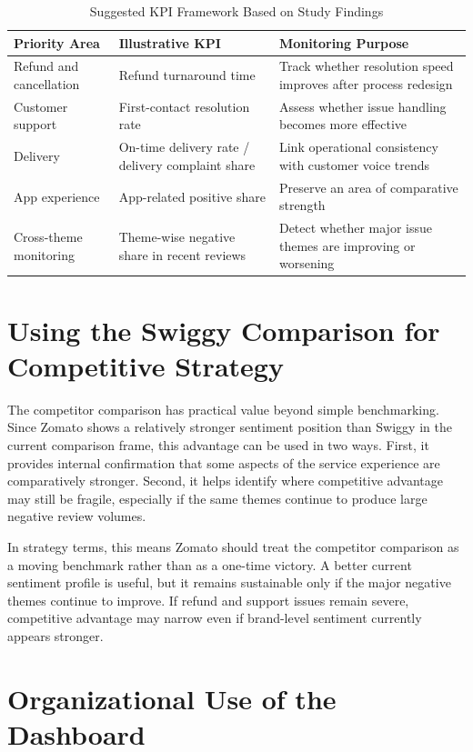 \begin{table}[h]
\centering
\caption{Suggested KPI Framework Based on Study Findings}
\begin{tabular}{p{}p{}p{}}
\toprule
\textbf{Priority Area} & \textbf{Illustrative KPI} & \textbf{Monitoring Purpose} \\
\midrule
Refund and cancellation & Refund turnaround time & Track whether resolution speed improves after process redesign \\
Customer support & First-contact resolution rate & Assess whether issue handling becomes more effective \\
Delivery & On-time delivery rate / delivery complaint share & Link operational consistency with customer voice trends \\
App experience & App-related positive share & Preserve an area of comparative strength \\
Cross-theme monitoring & Theme-wise negative share in recent reviews & Detect whether major issue themes are improving or worsening \\
\bottomrule
\end{tabular}
\end{table}

\section{Using the Swiggy Comparison for Competitive Strategy}

The competitor comparison has practical value beyond simple benchmarking. Since Zomato shows a relatively stronger sentiment position than Swiggy in the current comparison frame, this advantage can be used in two ways. First, it provides internal confirmation that some aspects of the service experience are comparatively stronger. Second, it helps identify where competitive advantage may still be fragile, especially if the same themes continue to produce large negative review volumes.

In strategy terms, this means Zomato should treat the competitor comparison as a moving benchmark rather than as a one-time victory. A better current sentiment profile is useful, but it remains sustainable only if the major negative themes continue to improve. If refund and support issues remain severe, competitive advantage may narrow even if brand-level sentiment currently appears stronger.

\section{Organizational Use of the Dashboard}

